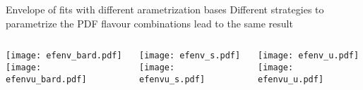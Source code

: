 \begin{frame}{Envelope of fits with different arametrization bases}
  Different strategies to parametrize the PDF flavour combinations lead to the same result
  \vspace*{-1em}
  \begin{columns}
      \begin{column}[T]{0.32\textwidth}
        \begin{center}
            \texttt{[image: efenv\_bard.pdf]} \\
            \texttt{[image: efenvu\_bard.pdf]} 
        \end{center}
      \end{column}
      \begin{column}[t]{0.32\textwidth}
        \begin{center}
            \texttt{[image: efenv\_s.pdf]} \\
            \texttt{[image: efenvu\_s.pdf]} 
        \end{center}
      \end{column}
      \begin{column}[t]{0.32\textwidth}
          \begin{center}
              \texttt{[image: efenv\_u.pdf]} \\
              \texttt{[image: efenvu\_u.pdf]} 
          \end{center}
        \end{column}
  \end{columns}

\end{frame}
